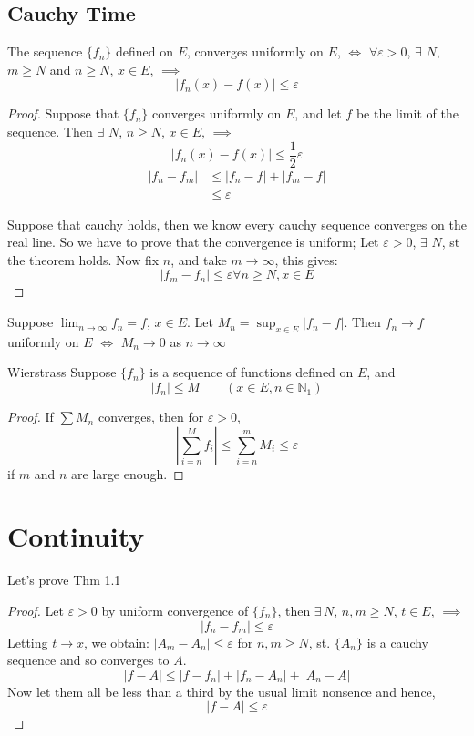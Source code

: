 \documentclass{article}
\newcommand{\N}{\mathbb{N}}
\newcommand{\e}{\varepsilon}
\newcommand{\ex}{\exists\,}
\begin{document}
\subsection{Cauchy Time}
\noindent\begin{theorem}{}{}
   The sequence $\{f_n\}$ defined on $E$, converges uniformly on $E$, $\iff$ $\forall \e > 0$, $\ex\,N$, $m \geq N$ and $n\geq N$, $x \in E$, $\implies$
   $$ |f_n(x) - f(x)|\le \e $$
\end{theorem}\vspace{10pt}

\begin{proof}
  Suppose that $\{f_n\}$ converges uniformly on $E$, and let $f$ be the limit of the sequence. Then $\ex\,N$, $n\geq N$, $x\in E,\,\implies$
  $$ |f_n(x) - f(x)| \le \frac{1}{2}\e $$
  \begin{align*}
    |f_n - f_m| &\le |f_n - f| + |f_m - f|\\
    &\le \e
  \end{align*}

  Suppose that cauchy holds, then we know every cauchy sequence converges on the real line. So we have to prove that the convergence is uniform; Let $\e >0$, $\ex\,N$, st the theorem holds. Now fix $n$, and take $m \to \infty$, this gives:
  $$ |f_m - f_n| \le \e \forall n \geq N, x\in E $$
\end{proof}

\noindent\begin{theorem}{}{}
   Suppose $\displaystyle{\lim_{n\to\infty}{f_n} = f}$, $x\in E$. Let $\displaystyle{M_n = \sup_{x\in E}{|f_n - f|}}$. Then $f_n \to f$ uniformly on $E$ $\iff$ $M_n \to 0$ as $n \to \infty$
\end{theorem}\vspace{10pt}


\noindent\begin{theorem}{Wierstrass}{}
  Suppose $\{f_n\}$ is a sequence of functions defined on $E$, and
  $$ |f_n| \le M \qquad (x\in E, n\in\N_1) $$
\end{theorem}\vspace{10pt}
\begin{proof}
  If $\displaystyle{\sum M_n}$ converges, then for $\e > 0$,
  $$ \left | \sum_{i = n}^M {f_i} \right| \le \sum_{i = n}^m {M_i} \le \e $$
  if $m$ and $n$ are large enough.
\end{proof}

\section{Continuity}
Let's prove Thm 1.1
\begin{proof}
  Let $\e > 0$ by uniform convergence of $\{f_n\}$, then $\ex N$, $n, m \geq N$, $t\in E,\,\implies$
  $$ |f_n - f_m| \le \e $$
  Letting $t\to x$, we obtain: $\displaystyle{|A_m - A_n| \le \e}$ for $n, m \geq N$, st. $\{ A_n\}$ is a cauchy sequence and so converges to $A$.
  $$ |f - A| \le |f - f_n| + |f_n - A_n| + |A_n - A| $$
  Now let them all be less than a third by the usual limit nonsence and hence,
  $$ |f - A| \le \e $$
\end{proof}
\end{document}
